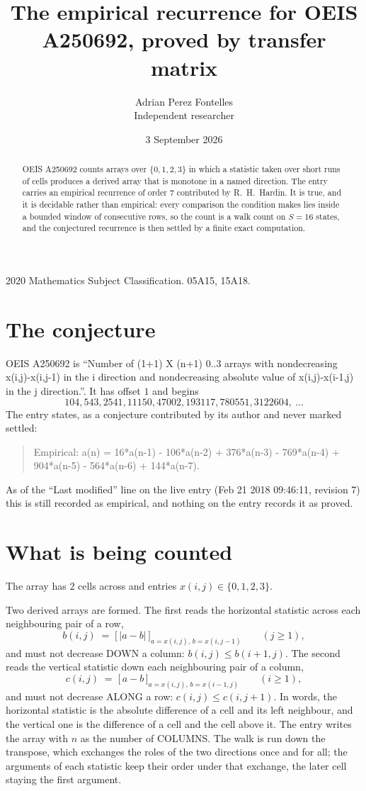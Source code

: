 \documentclass[11pt,a4paper]{article}
\title{The empirical recurrence for OEIS A250692, proved by transfer matrix}
\author{Adrian Perez Fontelles\\ \small Independent researcher}
\date{3 September 2026}
\theoremstyle{plain}
\theoremstyle{definition}
\begin{document}
\maketitle

\begin{abstract}
OEIS A250692 counts arrays over $\{0,1,2,3\}$ in which a statistic taken over short runs
of cells produces a derived array that is monotone in a named direction. The entry carries an
empirical recurrence of order $7$ contributed by R.~H.~Hardin. It is true, and it is
decidable rather than empirical: every comparison the condition makes lies inside a bounded
window of consecutive rows, so the count is a walk count on $S=16$ states, and the
conjectured recurrence is then settled by a finite exact computation.
\end{abstract}

\noindent\small 2020 Mathematics Subject Classification. 05A15, 15A18.\normalsize

\section{The conjecture}

OEIS A250692 is ``Number of (1+1) X (n+1) 0..3 arrays with nondecreasing x(i,j)-x(i,j-1) in the i direction and nondecreasing absolute value of x(i,j)-x(i-1,j) in the j direction.''. It has offset $1$ and begins
\[
104, 543, 2541, 11150, 47002, 193117, 780551, 3122604,\ \dots
\]
The entry states, as a conjecture contributed by its author and never marked settled:
\begin{quote}
Empirical: a(n) = 16*a(n-1) - 106*a(n-2) + 376*a(n-3) - 769*a(n-4) + 904*a(n-5) - 564*a(n-6) + 144*a(n-7).
\end{quote}
As of the ``Last modified'' line on the live entry (Feb 21 2018 09:46:11, revision 7) this is still
recorded as empirical, and nothing on the entry records it as proved.

\section{What is being counted}

The array has $2$ cells across and entries $x(i,j)\in\{0,1,2,3\}$.

Two derived arrays are formed. The first reads the horizontal statistic across each
neighbouring pair of a row,
\[
b(i,j)\;=\;\bigl[\,\lvert a-b\rvert\,\bigr]_{a=x(i,j),\,b=x(i,j-1)}\qquad (j\ge1),
\]
and must not decrease DOWN a column: $b(i,j)\le b(i{+}1,j)$. The second reads the vertical
statistic down each neighbouring pair of a column,
\[
c(i,j)\;=\;\bigl[\,a-b\,\bigr]_{a=x(i,j),\,b=x(i{-}1,j)}\qquad (i\ge1),
\]
and must not decrease ALONG a row: $c(i,j)\le c(i,j{+}1)$. In words, the horizontal statistic
is the absolute difference of a cell and its left neighbour, and the vertical one is
the difference of a cell and the cell above it. The entry writes the array with $n$ as the number of COLUMNS. The walk is run down the transpose, which exchanges the roles of the two directions once and for all; the arguments of each statistic keep their order under that exchange, the later cell staying the first argument.
\end{document}
